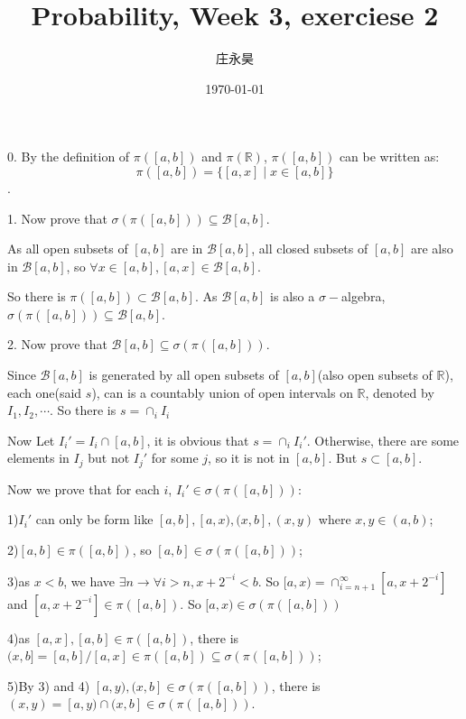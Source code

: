 \documentclass{article}
\title{Probability, Week 3, exerciese 2}
\author{庄永昊}
\date{\today}
\def\bab{\mathcal B[a,b]}
\def\spab{\sigma(\pi([a,b]))}
\begin{document}
\maketitle

0. By the definition of $\pi([a,b])$ and $\pi(\mathbb R)$, $\pi([a,b])$ can be written as: 
$$\pi([a,b])=\{[a,x]\mid x\in[a,b]\}$$. 

1. Now prove that $\spab\subseteq\bab$. 

As all open subsets of $[a,b]$ are in $\bab$, all closed subsets of $[a,b]$ are also in $\bab$, 
so $\forall x\in[a,b],[a,x]\in \bab$. 

So there is $\pi([a,b])\subset\bab$. As $\bab$ is also a $\sigma-$algebra, 
$\spab\subseteq\bab$. 

2. Now prove that $\bab\subseteq\spab$. 

Since $\bab$ is generated by all open subsets of $[a,b]$(also open subsets of $\mathbb R$), 
each one(said $s$), can is a countably union of open intervals on $\mathbb R$, 
denoted by $I_1,I_2,\cdots$. So there is $s=\cap_i I_i$ 

Now Let $I_i'=I_i\cap [a,b]$, it is obvious that $s=\cap_i I_i'$. Otherwise, there are some elements 
in $I_j$ but not $I_j'$ for some $j$, so it is not in $[a,b]$. But $s\subset [a,b]$. 

Now we prove that for each $i$, $I_i'\in\spab$: 

1)$I_i'$ can only be form like $[a,b],[a,x),(x,b],(x,y)$ where $x,y\in(a,b)$; 

2)$[a,b]\in\pi([a,b])$, so $[a,b]\in\spab$; 

3)as $x<b$, we have $\exists n\rightarrow\forall i>n,x+2^{-i}<b$. So 
$[a,x)=\cap_{i=n+1}^{\infty}[a,x+2^{-i}]$ and $[a,x+2^{-i}]\in\pi([a,b])$. So $[a,x)\in\spab$

4)as $[a,x],[a,b]\in\pi([a,b])$, there is $(x,b]=[a,b]/[a,x]\in\pi([a,b])\subseteq\spab$; 

5)By 3) and 4) $[a,y),(x,b]\in\spab$, there is $(x,y)=[a,y)\cap(x,b]\in\spab$. 
\end{document}
